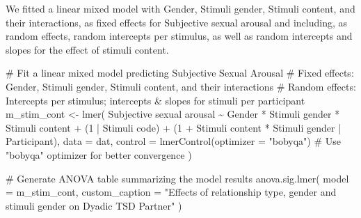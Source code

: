 \documentclass[
  bookmarksnumbered]{article}
\newenvironment{Shaded}{\begin{snugshade}}{\end{snugshade}}
\newcommand{\AttributeTok}[1]{\textcolor[rgb]{0.80,0.80,0.80}{#1}}
\newcommand{\CommentTok}[1]{\textcolor[rgb]{0.50,0.62,0.50}{#1}}
\newcommand{\DecValTok}[1]{\textcolor[rgb]{0.86,0.86,0.80}{#1}}
\newcommand{\FunctionTok}[1]{\textcolor[rgb]{0.94,0.94,0.56}{#1}}
\newcommand{\NormalTok}[1]{\textcolor[rgb]{0.80,0.80,0.80}{#1}}
\newcommand{\OtherTok}[1]{\textcolor[rgb]{0.94,0.94,0.56}{#1}}
\newcommand{\SpecialCharTok}[1]{\textcolor[rgb]{0.86,0.64,0.64}{#1}}
\newcommand{\StringTok}[1]{\textcolor[rgb]{0.80,0.58,0.58}{#1}}
\begin{document}
We fitted a linear mixed model with Gender, Stimuli gender, Stimuli content, and their interactions, as fixed effects for Subjective sexual arousal and including, as random effects, random intercepts per stimulus, as well as random intercepts and slopes for the effect of stimuli content.

\begin{Shaded}
\begin{Highlighting}[]
\CommentTok{\# Fit a linear mixed model predicting Subjective Sexual Arousal}
\CommentTok{\# Fixed effects: Gender, Stimuli gender, Stimuli content, and their interactions}
\CommentTok{\# Random effects: Intercepts per stimulus; intercepts \& slopes for stimuli per participant}
\NormalTok{m\_stim\_cont }\OtherTok{\textless{}{-}} \FunctionTok{lmer}\NormalTok{(}
  \StringTok{\textasciigrave{}}\AttributeTok{Subjective sexual arousal}\StringTok{\textasciigrave{}} \SpecialCharTok{\textasciitilde{}}\NormalTok{ Gender }\SpecialCharTok{*} \StringTok{\textasciigrave{}}\AttributeTok{Stimuli gender}\StringTok{\textasciigrave{}} \SpecialCharTok{*} \StringTok{\textasciigrave{}}\AttributeTok{Stimuli content}\StringTok{\textasciigrave{}} \SpecialCharTok{+}
\NormalTok{    (}\DecValTok{1} \SpecialCharTok{|} \StringTok{\textasciigrave{}}\AttributeTok{Stimuli code}\StringTok{\textasciigrave{}}\NormalTok{) }\SpecialCharTok{+}
\NormalTok{    (}\DecValTok{1} \SpecialCharTok{+} \StringTok{\textasciigrave{}}\AttributeTok{Stimuli content}\StringTok{\textasciigrave{}} \SpecialCharTok{*} \StringTok{\textasciigrave{}}\AttributeTok{Stimuli gender}\StringTok{\textasciigrave{}} \SpecialCharTok{|}\NormalTok{ Participant),}
  \AttributeTok{data =}\NormalTok{ dat,}
  \AttributeTok{control =} \FunctionTok{lmerControl}\NormalTok{(}\AttributeTok{optimizer =} \StringTok{"bobyqa"}\NormalTok{) }\CommentTok{\# Use "bobyqa" optimizer for better convergence}
\NormalTok{)}

\CommentTok{\# Generate ANOVA table summarizing the model results}
\FunctionTok{anova.sig.lmer}\NormalTok{(}
  \AttributeTok{model =}\NormalTok{ m\_stim\_cont,}
  \AttributeTok{custom\_caption =} \StringTok{"Effects of relationship type, gender and stimuli gender on Dyadic TSD Partner"}
\NormalTok{)}
\end{Highlighting}
\end{Shaded}
\end{document}
